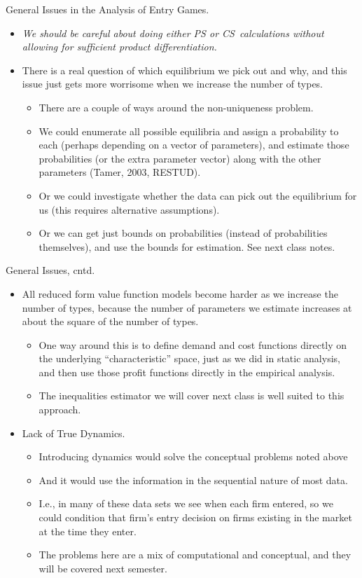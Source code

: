 \documentclass[xcolor=pdftex,dvipsnames,table,mathserif]{beamer}
\begin{document}
\begin{frame}{General Issues in the Analysis of Entry Games.}
\footnotesize

\begin{itemize}
\item \textit{We should be careful about doing either PS or CS\ calculations
without allowing for sufficient product differentiation. }
\item There is a real question of which equilibrium we pick out and why, and
this issue just gets more worrisome when we increase the number of types.
\begin{itemize}
\item There are a couple of ways around the non-uniqueness problem.
\item We could enumerate all possible equilibria and assign a probability to
each (perhaps depending on a vector of parameters), and estimate those
probabilities (or the extra parameter vector) along with the other
parameters (Tamer, 2003, RESTUD).
\item Or we could investigate whether the data can pick out the equilibrium
for us (this requires alternative assumptions).
\item Or we can get just bounds on probabilities (instead of probabilities
themselves), and use the bounds for estimation. See next class notes.
\end{itemize}
\end{itemize}
\end{frame}

\begin{frame}{General Issues, cntd.}
\footnotesize
\begin{itemize}
\item All reduced form value function models become harder as we increase
the number of types, because the number of parameters we estimate increases
at about the square of the number of types.
\begin{itemize}
\item One way around this is to define demand and cost functions directly on
the underlying ``characteristic''  space,
just as we did in static analysis, and then use those profit functions
directly in the empirical analysis.
\item The inequalities estimator we will cover next class is well suited to
this approach.
\end{itemize}
\item Lack of True Dynamics.
\begin{itemize}
\item Introducing dynamics would solve the conceptual problems noted above
\item And it would use the information in the sequential nature of most data.
\item I.e., in many of these data sets we see when each firm entered, so we
could condition that firm's entry decision on firms existing in the market
at the time they enter.
\item The problems here are a mix of computational and conceptual, and they
will be covered next semester.
\end{itemize}
\end{itemize}
\end{frame}
\end{document}
